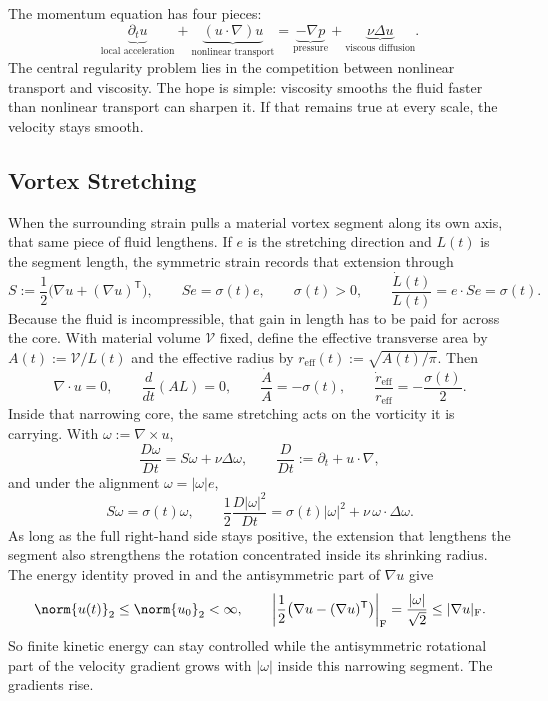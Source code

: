 
The momentum equation has four pieces:
\[
  \underbrace{\partial_t u}_{\text{local acceleration}}
  +
  \underbrace{(u\cdot\nabla)u}_{\text{nonlinear transport}}
  =
  \underbrace{-\nabla p}_{\text{pressure}}
  +
  \underbrace{\nu\Delta u}_{\text{viscous diffusion}}.
\]
The central regularity problem lies in the competition between nonlinear transport and viscosity.
The hope is simple: viscosity smooths the fluid faster than nonlinear transport can sharpen it.
If that remains true at every scale, the velocity stays smooth.

\subsection{Vortex Stretching}\label{sub:ThePerfectlyStretchingVortex}

When the surrounding strain pulls a material vortex segment along its own axis, that same piece of fluid lengthens. If \(e\) is the stretching direction and \(L(t)\) is the segment length, the symmetric strain records that extension through
\[
  S:=\frac12\bigl(\nabla u+(\nabla u)^{\mathsf T}\bigr),
  \qquad
  Se=\sigma(t)e,
  \qquad
  \sigma(t)>0,
  \qquad
  \frac{\dot L(t)}{L(t)}
  =
  e\cdot Se
  =
  \sigma(t).
\]
Because the fluid is incompressible, that gain in length has to be paid for across the core. With material volume \(\mathcal V\) fixed, define the effective transverse area by \(A(t):=\mathcal V/L(t)\) and the effective radius by \(r_{\mathrm{eff}}(t):=\sqrt{A(t)/\pi}\). Then
\[
  \nabla\cdot u=0,
  \qquad
  \frac{d}{dt}(A L)=0,
  \qquad
  \frac{\dot A}{A}=-\sigma(t),
  \qquad
  \frac{\dot r_{\mathrm{eff}}}{r_{\mathrm{eff}}}
  =
  -\frac{\sigma(t)}{2}.
\]
Inside that narrowing core, the same stretching acts on the vorticity it is carrying. With \(\omega:=\nabla\times u\),
\[
  \frac{D\omega}{Dt}
  =
  S\omega+\nu\Delta\omega,
  \qquad
  \frac{D}{Dt}
  :=
  \partial_t+u\cdot\nabla,
\]
and under the alignment \(\omega=|\omega|e\),
\[
  S\omega
  =
  \sigma(t)\omega,
  \qquad
  \frac12\frac{D|\omega|^2}{Dt}
  =
  \sigma(t)|\omega|^2
  +
  \nu\,\omega\cdot\Delta\omega.
\]
As long as the full right-hand side stays positive, the extension that lengthens the segment also strengthens the rotation concentrated inside its shrinking radius. The energy identity proved in  and the antisymmetric part of \(\nabla u\) give
\[
  \norm{u(t)}_2
  \leq
  \norm{u_0}_2
  <\infty,
  \qquad
  \left|\frac12\bigl(\nabla u-(\nabla u)^{\mathsf T}\bigr)\right|_{\mathrm F}
  =
  \frac{|\omega|}{\sqrt2}
  \leq
  |\nabla u|_{\mathrm F}.
\]
So finite kinetic energy can stay controlled while the antisymmetric rotational part of the velocity gradient grows with \(|\omega|\) inside this narrowing segment. The gradients rise.

